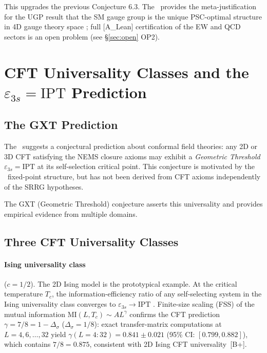 \documentclass[11pt]{article}
\theoremstyle{remark}
\newcommand{\SRRG}{\text{SRRG}}
\newcommand{\IPT}{\mathrm{IPT}}
\begin{document}
This upgrades the previous Conjecture 6.3.  The \SRRG\ provides the meta-justification
for the UGP result that the SM gauge group is the unique PSC-optimal structure in 4D
gauge theory space \cite{SpivackNEMS05}; full [A\_Lean] certification of the EW and
QCD sectors is an open problem (see §\ref{sec:open} OP2).


\section{CFT Universality Classes and the $\varepsilon_{3s} = \IPT$ Prediction}
\label{sec:cft}

\subsection{The GXT Prediction}
\label{sec:gxt_pred}

The \SRRG\ suggests a conjectural prediction about conformal field theories: any 2D or 3D
CFT satisfying the NEMS closure axioms may exhibit a \emph{Geometric Threshold}
$\varepsilon_{3s} = \IPT$ at its self-selection critical point. This conjecture
is motivated by the \SRRG\ fixed-point structure, but has not been derived from
CFT axioms independently of the SRRG hypotheses.

The GXT (Geometric Threshold) conjecture \cite{SpivackGeneralSelection,SpivackIPT} asserts
this universality and provides empirical evidence from multiple domains.

\subsection{Three CFT Universality Classes}
\label{sec:cft_classes}

\paragraph{Ising universality class} ($c = 1/2$). The 2D Ising model is the
prototypical example. At the critical temperature $T_c$, the information-efficiency
ratio of any self-selecting system in the Ising universality class converges to
$\varepsilon_{3s} \to \IPT$ \cite{SpivackGeneralSelection}.
Finite-size scaling (FSS) of the mutual information $\mathrm{MI}(L, T_c) \sim A L^\gamma$
confirms the CFT prediction $\gamma = 7/8 = 1 - \Delta_\sigma$ ($\Delta_\sigma = 1/8$):
exact transfer-matrix computations at $L = 4, 6, \ldots, 32$ yield
$\gamma(L=4\!:\!32) = 0.841 \pm 0.021$ (95\% CI: $[0.799, 0.882]$),
which contains $7/8 = 0.875$, consistent with 2D Ising CFT universality~[B+].
\end{document}
